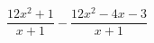 \begin{ex}
	\begin{condition}
		\( \dfrac{12x^2+1}{x+1}-\dfrac{12x^2-4x-3}{x+1} \)
	\end{condition}
\end{ex}